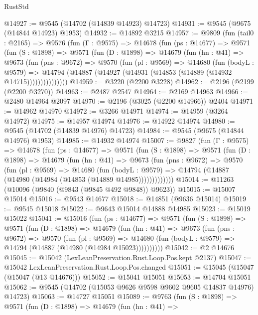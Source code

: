 \begin{lexlean}{RustStd}
\begin{coremodule}
@14927 := @9545 (@14702 (@14839 @14923) @14723)
@14931 := @9545 (@9675 (@14844 @14923) @1953)
@14932 := @14892 @3215
@14957 := @9809
    (fun (tail0 : @2165) =>
    @9576
      (fun (Γ : @9575) =>
      @14678
        (fun (ps : @14677) =>
        @9571
          (fun (S : @1898) =>
          @9571
            (fun (D : @1898) =>
            @14679
              (fun (hn : @41) =>
              @9673
                (fun (pns : @9672) =>
                @9570
                  (fun (pl : @9569) =>
                  @14680
                    (fun (bodyL : @9579) =>
                    @14794 (@14887 (@14927 (@14931 (@14853 (@14889 (@14932 @14715)))))))))))))))
@14959 := @3220 (@2200 @3228)
@14962 := @2196 (@2199 (@2200 @3270))
@14963 := @2487 @2547
@14964 := @2169 @14963
@14966 := @2480 @14964 @2097
@14970 := @2196 (@3025 (@2200 @14966)) @2404
@14971 := @14962 @14970
@14972 := @3266 @14971
@14974 := @14959 (@3264 @14972)
@14975 := @14957 @14974
@14976 := @14922 @14974
@14980 := @9545 (@14702 (@14839 @14976) @14723)
@14984 := @9545 (@9675 (@14844 @14976) @1953)
@14985 := @14932 @14974
@15007 := @9827
    (fun (Γ : @9575) =>
    @14678
      (fun (ps : @14677) =>
      @9571
        (fun (S : @1898) =>
        @9571
          (fun (D : @1898) =>
          @14679
            (fun (hn : @41) =>
            @9673
              (fun (pns : @9672) =>
              @9570
                (fun (pl : @9569) =>
                @14680
                  (fun (bodyL : @9579) =>
                  @14794 (@14887 (@14980 (@14984 (@14853 (@14889 @14985)))))))))))))
@15014 := @11263 (@10096 (@9840 (@9843 (@9845 @492 @9848)) @9623))
@15015 := @15007 @15014
@15016 := @9543 @14677
@15018 := @14851 (@9636 @15014)
@15019 := @9545 @15018
@15022 := @9643 @15014 @14888 @14985
@15023 := @15019 @15022
@15041 := @15016
    (fun (ps : @14677) =>
    @9571
      (fun (S : @1898) =>
      @9571
        (fun (D : @1898) =>
        @14679
          (fun (hn : @41) =>
          @9673
            (fun (pns : @9672) =>
            @9570
              (fun (pl : @9569) =>
              @14680 (fun (bodyL : @9579) => @14794 (@14887 (@14980 (@14984 @15023))))))))))
@15042 := @2 @14676
@15045 := @15042 (LexLeanPreservation.Rust.Loop.Pos.kept @2137)
@15047 := @15042 LexLeanPreservation.Rust.Loop.Pos.changed
@15051 := @15045 (@15047 (@15047 (@13 @14676)))
@15052 := @15041 @15051
@15053 := @14704 @15051
@15062 := @9545 (@14702 (@15053 @9626 @9598 @9602 @9605 @14837 @14976) @14723)
@15063 := @14727 @15051
@15089 := @9763
    (fun (S : @1898) =>
    @9571
      (fun (D : @1898) =>
      @14679
        (fun (hn : @41) =>

\end{coremodule}
\end{lexlean}
